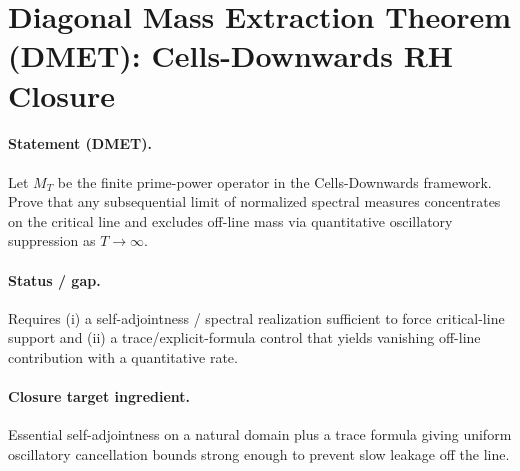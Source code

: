\section{Diagonal Mass Extraction Theorem (DMET): Cells-Downwards RH Closure}

\paragraph{Statement (DMET).}
Let $M_T$ be the finite prime-power operator in the Cells-Downwards framework.
Prove that any subsequential limit of normalized spectral measures concentrates on the critical line and
excludes off-line mass via quantitative oscillatory suppression as $T\to\infty$.

\paragraph{Status / gap.}
Requires (i) a self-adjointness / spectral realization sufficient to force critical-line support and (ii) a
trace/explicit-formula control that yields vanishing off-line contribution with a quantitative rate.

\paragraph{Closure target ingredient.}
Essential self-adjointness on a natural domain plus a trace formula giving uniform oscillatory cancellation bounds
strong enough to prevent slow leakage off the line.
